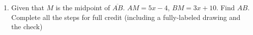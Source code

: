 \documentclass[12pt, twoside]{article}
\begin{document}
\begin{enumerate}
\item Given that $M$ is the midpoint of $\overline{AB}$. $AM=5x-4$, $BM=3x+10$. Find ${AB}$.\\
Complete all the steps for full credit (including a fully-labeled drawing and the check)

\end{enumerate}
\end{document}
